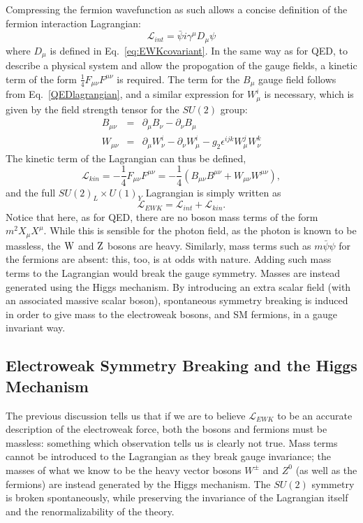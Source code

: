 Compressing the fermion wavefunction as such allows a concise definition of the fermion interaction Lagrangian:
\begin{equation}
\mathcal{L}_{int} = \bar{\psi} i \gamma^{\mu} D_{\mu} \psi
\end{equation} 
where $D_{\mu}$ is defined in Eq.~\ref{eq:EWKcovariant}.
In the same way as for \ac{QED}, to describe a physical system and allow the propogation of the gauge fields, 
a kinetic term of the form $\frac{1}{4}F_{\mu \nu}F^{\mu \nu}$ is required. 
The term for the $B_{\mu}$ gauge field follows from Eq.~\ref{QEDlagrangian}, 
and a similar expression for $W^{i}_{\mu}$ is necessary, which is given by the field strength tensor for the $SU(2)$ group:
\begin{eqnarray}
B_{\mu\nu} &=& \partial_{\mu}B_{\nu} - \partial_{\nu}B_{\mu} \\
W_{\mu\nu} &=& \partial_{\mu}W^{i}_{\nu} - \partial_{\nu}W^{i}_{\mu} -g_{2} \epsilon^{ijk} W^{j}_{\mu} W^{k}_{\nu} 
\end{eqnarray}
%
The kinetic term of the Lagrangian can thus be defined,
\begin{equation}
\mathcal{L}_{kin} = - \frac{1}{4}F_{\mu \nu}F^{\mu \nu} = - \frac{1}{4}\left( B_{\mu\nu}B^{\mu\nu} +  W_{\mu\nu} W^{\mu\nu} \right),
\end{equation}
and the full $SU(2)_{L} \times U(1)_{Y}$ Lagrangian is simply written as
\begin{equation}
\mathcal{L}_{EWK} = \mathcal{L}_{int} + \mathcal{L}_{kin}.
\end{equation}
Notice that here, as for \ac{QED}, there are no boson mass terms of the form $m^{2}X_{\mu}X^{\mu}$. 
While this is sensible for the photon field, as the photon is known to be massless, the $\mathrm{W}$ and $\mathrm{Z}$ bosons are heavy. 
Similarly, mass terms such as $m\bar{\psi} \psi$ for the fermions are absent: this, too, is at odds with nature.
Adding such mass terms to the Lagrangian would break the gauge symmetry.
%
Masses are instead generated using the Higgs mechanism. 
By introducing an extra scalar field (with an associated massive scalar boson), spontaneous symmetry breaking is induced in order to give mass to the electroweak bosons, and \ac{SM} fermions, in a gauge invariant way.


\subsection{Electroweak Symmetry Breaking and the Higgs Mechanism \label{th:Higgs}}
%
The previous discussion tells us that if we are to believe $\mathcal{L}_{EWK}$ to be an accurate description of the electroweak force, 
both the bosons and fermions must be massless: something which observation tells us is clearly not true.
Mass terms cannot be introduced to the Lagrangian as they break gauge invariance;
the masses of what we know to be the heavy vector bosons $W^{\pm}$ and $Z^{0}$ 
(as well as the fermions) are instead generated by the Higgs mechanism.
The $SU(2)$ symmetry is broken spontaneously, while preserving the invariance of the Lagrangian itself and the renormalizability of the theory.

